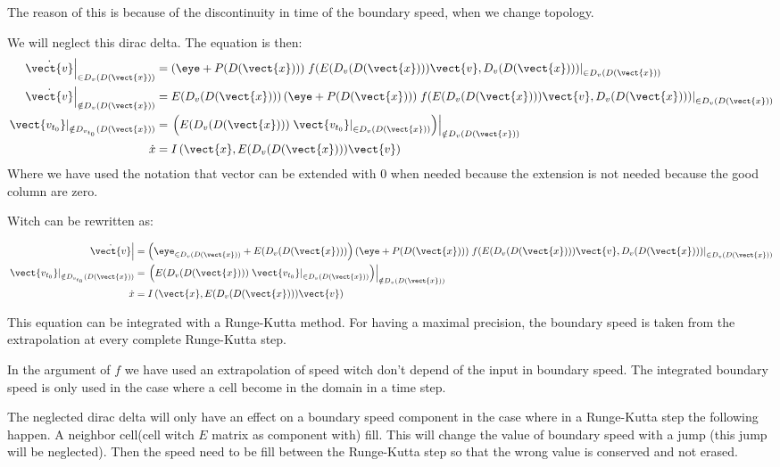 The reason of this is because of the discontinuity in time of the boundary speed, when we change topology.

We will neglect this dirac delta. The equation is then:
\begin{align}
	\left.\dot{\vect{v}}\right|_{\in D_{v}(D(\vect{x}))}&=\left(\eye+P(D(\vect{x}))\right)\left.f(E(D_v(D(\vect{x})))\vect{v},D_{v}(D(\vect{x})))\right|_{\in D_{v}(D(\vect{x}))}\\
	\left.\dot{\vect{v}}\right|_{\notin D_{v}(D(\vect{x}))}&=E(D_v(D(\vect{x})))\left(\eye+P(D(\vect{x}))\right)\left.f(E(D_v(D(\vect{x})))\vect{v},D_{v}(D(\vect{x})))\right|_{\in D_{v}(D(\vect{x}))}\\
	\left.\vect{v_{t_0}}\right|_{\notin D_{v_{t_0}}(D(\vect{x}))}&=\left.\left(E(D_v(D(\vect{x})))\left.\vect{v_{t_0}}\right|_{\in D_{v}(D(\vect{x}))}\right)\right|_{\notin D_{v}(D(\vect{x}))}\\
	\dot{x}&=I\left(\vect{x},E(D_v(D(\vect{x})))\vect{v}\right)\\
\end{align}
Where we have used the notation that vector can be extended with 0 when needed because the extension is not needed because the good column are zero.

Witch can be rewritten as:

\begin{align}
	\left.\dot{\vect{v}}\right|&=\left(\eye_{\in D_{v}(D(\vect{x}))}+E(D_v(D(\vect{x})))\right)\left(\eye+P(D(\vect{x}))\right)\left.f(E(D_v(D(\vect{x})))\vect{v},D_{v}(D(\vect{x})))\right|_{\in D_{v}(D(\vect{x}))}\\
	\left.\vect{v_{t_0}}\right|_{\notin D_{v_{t_0}}(D(\vect{x}))}&=\left.\left(E(D_v(D(\vect{x})))\left.\vect{v_{t_0}}\right|_{\in D_{v}(D(\vect{x}))}\right)\right|_{\notin D_{v}(D(\vect{x}))}\\
	\dot{x}&=I\left(\vect{x},E(D_v(D(\vect{x})))\vect{v}\right)\\
\end{align}

This equation can be integrated with a Runge-Kutta method.
For having a maximal precision, the boundary speed is taken from the extrapolation at every complete Runge-Kutta step.

In the argument of $f$ we have used an extrapolation of speed witch don't depend of the input in boundary speed.
The integrated boundary speed is only used in the case where a cell become in the domain in a time step.

The neglected dirac delta will only have an effect on a boundary speed component in the case where in a Runge-Kutta step the following happen.
A neighbor cell(cell witch $E$ matrix as component with) fill. This will change the value of boundary speed with a jump (this jump will be neglected).
Then the speed need to be fill between the Runge-Kutta step so that the wrong value is conserved and not erased.

